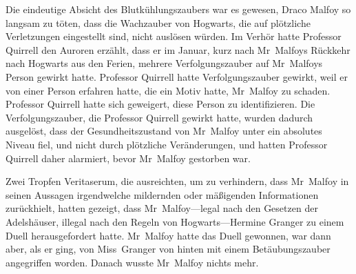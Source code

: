 Die eindeutige Absicht des Blutkühlungszaubers war es gewesen, Draco Malfoy so langsam zu töten, dass die Wachzauber von Hogwarts, die auf plötzliche Verletzungen eingestellt sind, nicht auslösen würden. Im Verhör hatte Professor Quirrell den Auroren erzählt, dass er im Januar, kurz nach Mr~Malfoys Rückkehr nach Hogwarts aus den Ferien, mehrere Verfolgungszauber auf Mr~Malfoys Person gewirkt hatte. Professor Quirrell hatte Verfolgungszauber gewirkt, weil er von einer Person erfahren hatte, die ein Motiv hatte, Mr~Malfoy zu schaden. Professor Quirrell hatte sich geweigert, diese Person zu identifizieren. Die Verfolgungszauber, die Professor Quirrell gewirkt hatte, wurden dadurch ausgelöst, dass der Gesundheitszustand von Mr~Malfoy unter ein absolutes Niveau fiel, und nicht durch plötzliche Veränderungen, und hatten Professor Quirrell daher alarmiert, bevor Mr~Malfoy gestorben war.

Zwei Tropfen Veritaserum, die ausreichten, um zu verhindern, dass Mr~Malfoy in seinen Aussagen irgendwelche mildernden oder mäßigenden Informationen zurückhielt, hatten gezeigt, dass Mr~Malfoy—legal nach den Gesetzen der Adelshäuser, illegal nach den Regeln von Hogwarts—Hermine Granger zu einem Duell herausgefordert hatte. Mr~Malfoy hatte das Duell gewonnen, war dann aber, als er ging, von Miss~Granger von hinten mit einem Betäubungszauber angegriffen worden. Danach wusste Mr~Malfoy nichts mehr.


